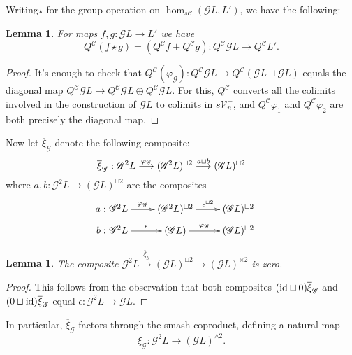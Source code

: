 \documentclass[11pt]{amsart}
\theoremstyle{plain}
\newtheorem{lem}[thm]{Lemma}
\theoremstyle{definition}
\let\phi\varphi
\renewcommand{\to}{\longrightarrow}
\newcommand{\scrG}{\mathscr{G}}
\newcommand{\calC}{\mathcal{C}}
\newcommand{\calV}{\mathcal{V}}
\theoremstyle{plain}
\newcommand{\vect}[2]{\calV^{#1}_{#2}}
\newcommand{\BSW}{{\scrG}}
\newcommand{\Id}{\textup{id}}
\begin{document}
\begin{Composite functor spectral sequences}
Writing$\star$ for the group operation on $\hom_{s\calC}(\BSW L,L')$, we have the following:
\begin{lem}
For maps $f,g:\BSW L\to L'$ we have 
\[Q^{\calC}(f\star g)=(Q^{\calC}f+Q^{\calC}g):Q^{\calC}\BSW L\to Q^{\calC}L'.\]
\end{lem}
\begin{proof}
It's enough to check that $Q^{\calC}(\phi_\BSW ):Q^{\calC}\BSW L\to Q^{\calC}(\BSW L\sqcup \BSW L)$ equals the diagonal map $Q^{\calC}\BSW L\to Q^{\calC}\BSW L\oplus Q^{\calC}\BSW L$. For this, $Q^{\calC}$ converts all the colimits involved in the construction of $\BSW L$ to colimits in $s\vect{+}{n}$, and $Q^{\calC}\phi_1$ and $Q^{\calC}\phi_2$ are both precisely the diagonal map.
\end{proof}

Now let $\overline{\xi}_{\BSW }$ denote the following composite:
\[\makebox[0mm][r]{$\overline{\xi}_{\BSW }:\ $}\BSW^2L\overset{\phi_{\BSW }}{\to}(\BSW^2L)^{\sqcup2}\overset{a\sqcup b}{\to}(\BSW L)^{\sqcup2}\]
where $a,b:\BSW^2L\to(\BSW L)^{\sqcup2}$ are the composites
\[\xymatrix@R=2mm{
\makebox[0mm][r]{$a:\ $}\BSW^2L\ar[r]^-{\phi_{\BSW }}
&%
(\BSW^2L)^{\sqcup2}\ar[r]^-{\epsilon^{\sqcup2}}
&%
(\BSW L)^{\sqcup2}\\
\makebox[0mm][r]{$b:\ $}\BSW^2L\ar[r]^-{\epsilon}
&%
(\BSW L)\ar[r]^-{\phi_{\BSW }}
&%
(\BSW L)^{\sqcup2}
}\]
\begin{lem}
The composite 
$\BSW^2L\overset{\overline{\xi}_{\BSW }}{\to}(\BSW L)^{\sqcup2}\to(\BSW L)^{\times2}$ is zero.
\end{lem}
\begin{proof}
This follows from the observation that both composites $(\Id\sqcup0)\overline{\xi}_{\BSW }$ and $(0\sqcup\Id)\overline{\xi}_{\BSW }$ equal $\epsilon:\BSW^2L\to \BSW L$.
\end{proof}
In particular, $\overline{\xi}_{\BSW }$ factors through the smash coproduct, defining a natural map
\[\xi_{\BSW }:\BSW^2L\to (\BSW L)^{\wedge 2}.\]


\end{Composite functor spectral sequences}
\end{document}
